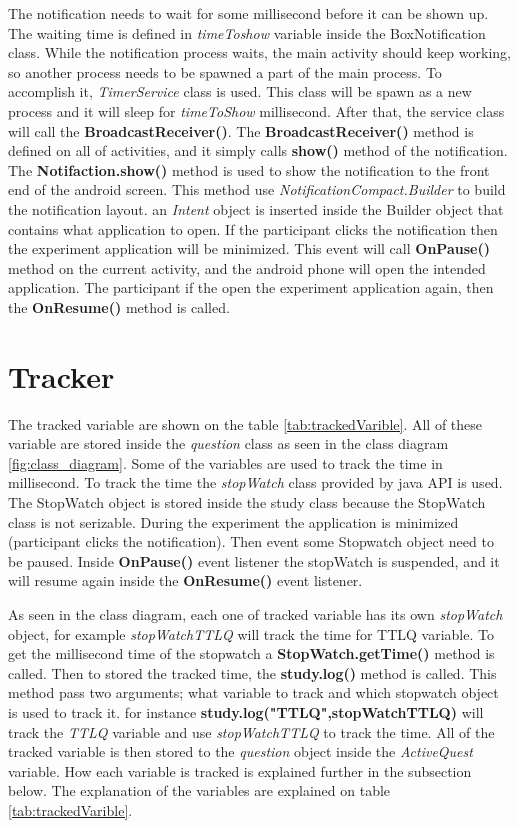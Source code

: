 The notification needs to wait for some millisecond before it can be shown up. The waiting time is defined in \textit{timeToshow} variable inside the BoxNotification class.
While the notification process waits, the main activity should keep working, so another process needs to be spawned a part of the main process.
To accomplish it, \textit{TimerService} class is used. This class will be spawn as a new process and it will sleep for \textit{timeToShow} millisecond.
After that, the service class will call the \textbf{BroadcastReceiver()}.
The \textbf{BroadcastReceiver()} method  is defined on all of activities, and it simply calls \textbf{show()} method of the notification.
The \textbf{Notifaction.show()} method is used to show the notification to the front end of the android screen. This method use
 \textit{NotificationCompact.Builder} to build the notification layout.
 an \textit{Intent} object is inserted inside the Builder object that contains what application to open.
 If the participant clicks the notification then the experiment application will be minimized.
 This event will call \textbf{OnPause()} method on the current activity, and the android phone will open the intended application.
 The participant if the open the experiment application again, then the \textbf{OnResume()} method is called.


\section{Tracker}

The tracked variable are shown on the table \ref{tab:trackedVarible}.
All of these variable are stored inside the \textit{question} class as seen in the class diagram \ref{fig:class_diagram}.
Some of the variables are used to track the time in millisecond.
To track the time the \textit{stopWatch} class provided by java API is used.
The StopWatch object is stored inside the study class because the StopWatch class is not serizable.
During the experiment the application is minimized (participant clicks the notification).
Then event some Stopwatch object need to be paused. Inside \textbf{OnPause()} event listener the stopWatch is suspended,
and it will resume again inside the \textbf{OnResume()} event listener.

As seen in the class diagram, each one of tracked variable has its own \textit{stopWatch} object, for example \textit{stopWatchTTLQ} will track the time for TTLQ variable.
To get the millisecond time of the stopwatch a \textbf{StopWatch.getTime()} method is called.
Then to stored the tracked time, the \textbf{study.log()} method is called.
This method pass two arguments; what variable to track and which stopwatch object is used to track it.
for instance \textbf{study.log("TTLQ",stopWatchTTLQ)} will track the \textit{TTLQ} variable and use \textit{stopWatchTTLQ} to track the time.
All of the tracked variable is then stored to the \textit{question} object inside the \textit{ActiveQuest} variable.
How each variable is tracked is explained further in the subsection below.
The explanation of the variables are explained on table \ref{tab:trackedVarible}.

